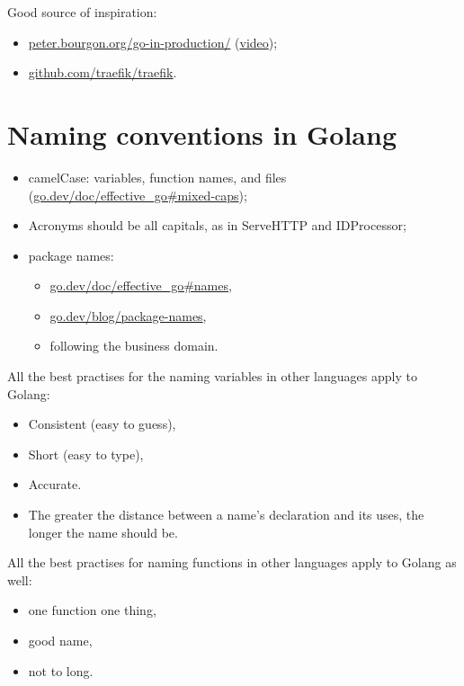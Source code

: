 \documentclass[11pt, letterpaper]{article}
\begin{document}
Good source of inspiration:

\begin{itemize}%
\item \href{https://peter.bourgon.org/go-in-production/}{peter.bourgon.org/go-in-production/} (\href{https://www.youtube.com/watch?v=PTE4VJIdHPg}{video});
\item \href{https://github.com/traefik/traefik}{github.com/traefik/traefik}.
\end{itemize}%

\section{Naming conventions in Golang}

\begin{itemize}%
\item camelCase: variables, function names, and files (\href{https://go.dev/doc/effective\_go\#mixed-caps}{go.dev/doc/effective\_go\#mixed-caps});
\item Acronyms should be all capitals, as in ServeHTTP and IDProcessor;
\item package names: \begin{itemize}%
\item \href{https://go.dev/doc/effective\_go\#names}{go.dev/doc/effective\_go\#names},
\item \href{https://go.dev/blog/package-names}{go.dev/blog/package-names},
\item following the business domain.
\end{itemize}%
\end{itemize}%

All the best practises for the naming variables in other languages apply to Golang:

\begin{itemize}%
\item Consistent (easy to guess),
\item Short (easy to type),
\item Accurate.
\item The greater the distance between a name's declaration and its uses, 
the longer the name should be.
\end{itemize}%

All the best practises for naming functions in other languages apply to Golang as well:

\begin{itemize}%
\item one function one thing,
\item good name,
\item not to long.
\end{itemize}%
\end{document}
